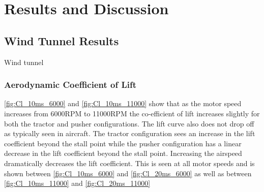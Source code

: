 \graphicspath{{./Figs/}}

\chapter{Results and Discussion} 

\section{Wind Tunnel Results}
Wind tunnel 

\subsection{Aerodynamic Coefficient of Lift}
\cref{fig:Cl_10ms_6000} and \cref{fig:Cl_10ms_11000} show that as the motor speed increases from 6000RPM to 11000RPM the co-efficient of lift increases slightly for both the tractor and pusher configurations. The lift curve also does not drop off as typically seen in aircraft. The tractor configuration sees an increase in the lift coefficient beyond the stall point while the pusher configuration has a linear decrease in the lift coefficient beyond the stall point. Increasing the airspeed dramatically decreases the lift coefficient. This is seen at all motor speeds and is shown between \cref{fig:Cl_10ms_6000} and \cref{fig:Cl_20ms_6000} as well as between \cref{fig:Cl_10ms_11000} and \cref{fig:Cl_20ms_11000}
